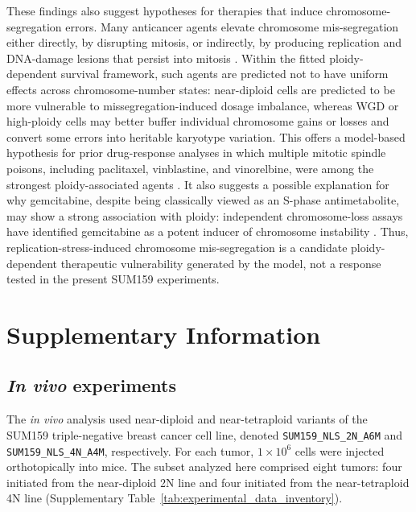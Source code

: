 \documentclass[11pt]{article}
\begin{document}
These findings also suggest hypotheses for therapies that induce chromosome-segregation errors. Many anticancer agents elevate chromosome mis-segregation either directly, by disrupting mitosis, or indirectly, by producing replication and DNA-damage lesions that persist into mitosis \cite{lee_effects_2016,zasadil_cytotoxicity_2014,scribano_chromosomal_2021,pedersen_topbp1_2015,chan_replication_2009,minocherhomji_replication_2015,beeharry_centromere_2013}. Within the fitted ploidy-dependent survival framework, such agents are predicted not to have uniform effects across chromosome-number states: near-diploid cells are predicted to be more vulnerable to missegregation-induced dosage imbalance, whereas WGD or high-ploidy cells may better buffer individual chromosome gains or losses and convert some errors into heritable karyotype variation. This offers a model-based hypothesis for prior drug-response analyses in which multiple mitotic spindle poisons, including paclitaxel, vinblastine, and vinorelbine, were among the strongest ploidy-associated agents \cite{kimmel_integrating_2020}. It also suggests a possible explanation for why gemcitabine, despite being classically viewed as an S-phase antimetabolite, may show a strong association with ploidy: independent chromosome-loss assays have identified gemcitabine as a potent inducer of chromosome instability \cite{lee_effects_2016}. Thus, replication-stress-induced chromosome mis-segregation is a candidate ploidy-dependent therapeutic vulnerability generated by the model, not a response tested in the present SUM159 experiments.

\section{Supplementary Information}


\renewcommand{\figurename}{Supplementary Figure}
\setcounter{figure}{0}
\renewcommand{\tablename}{Supplementary Table}
\setcounter{table}{0}

\subsection{\textit{In vivo} experiments}
\label{invivo}

The \textit{in vivo} analysis used near-diploid and near-tetraploid variants of the SUM159 triple-negative breast cancer cell line, denoted \texttt{SUM159\_NLS\_2N\_A6M} and \texttt{SUM159\_NLS\_4N\_A4M}, respectively. For each tumor, $1 \times 10^6$ cells were injected orthotopically into mice. The subset analyzed here comprised eight tumors: four initiated from the near-diploid 2N line and four initiated from the near-tetraploid 4N line (Supplementary Table~\ref{tab:experimental_data_inventory}).
\end{document}

